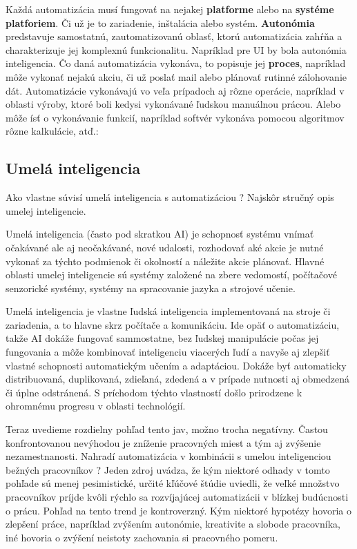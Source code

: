 \documentclass[twoside,slovak, a4paper]{article}
\begin{document}
Každá automatizácia musí fungovať na nejakej \textbf{platforme} alebo na \textbf{systéme platforiem}. Či už je to zariadenie, inštalácia alebo systém. 
\textbf{Autonómia} predstavuje samostatnú, zautomatizovanú oblasť, ktorú automatizácia zahŕňa a charakterizuje jej komplexnú funkcionalitu. Napríklad pre UI by bola autonómia inteligencia. Čo daná automatizácia vykonáva, to popisuje jej \textbf{proces}, napríklad môže vykonať nejakú akciu, či už poslať mail alebo plánovať rutinné zálohovanie dát. Automatizácie vykonávajú vo veľa prípadoch aj rôzne operácie, napríklad v oblasti výroby, ktoré boli kedysi vykonávané ľudskou manuálnou prácou. Alebo môže ísť o vykonávanie funkcií, napríklad softvér vykonáva pomocou algoritmov rôzne kalkulácie, atď.\cite{Nof2009}:

\subsection{Umelá inteligencia}

Ako vlastne súvisí umelá inteligencia s automatizáciou ? Najskôr stručný opis umelej inteligencie.

Umelá inteligencia (často pod skratkou AI) je schopnosť systému vnímať očakávané ale aj neočakávané, nové udalosti, rozhodovať aké akcie je nutné vykonať za týchto podmienok či okolností a náležite akcie plánovať. Hlavné oblasti umelej inteligencie sú systémy založené na zbere vedomostí, počítačové senzorické systémy, systémy na spracovanie jazyka a strojové učenie.\cite{Nof2009}

Umelá inteligencia je vlastne ľudská inteligencia implementovaná na stroje či zariadenia, a to hlavne skrz počítače a komunikáciu. Ide opäť o automatizáciu, takže AI dokáže fungovať sammostatne, bez ľudskej manipulácie počas jej fungovania a môže kombinovať inteligenciu viacerých ľudí a navyše aj zlepšiť vlastné schopnosti automatickým učením a adaptáciou. Dokáže byť automaticky distribuovaná, duplikovaná, zdieľaná, zdedená a v prípade nutnosti aj obmedzená či úplne odstránená. S príchodom týchto vlastností došlo prirodzene k ohromnému progresu v oblasti technológií.\cite{Nof2009}

Teraz uvedieme rozdielny pohľad tento jav, možno trocha negatívny. Častou konfrontovanou nevýhodou je zníženie pracovných miest a tým aj zvýšenie nezamestnanosti. Nahradí automatizácia v kombinácii s umelou inteligenciou bežných pracovníkov ? Jeden zdroj uvádza, že kým niektoré odhady v tomto pohľade sú menej pesimistické, určité kľúčové štúdie uviedli, že veľké množstvo pracovníkov príjde kvôli rýchlo sa rozvíjajúcej automatizácii v blízkej budúcnosti o prácu. Pohľad na tento trend je kontroverzný. Kým niektoré hypotézy hovoria o zlepšení práce, napríklad zvýšením autonómie, kreativite a slobode pracovníka, iné hovoria o zvýšení neistoty zachovania si pracovného pomeru.\cite{NAZARENO2021101679}
\end{document}
